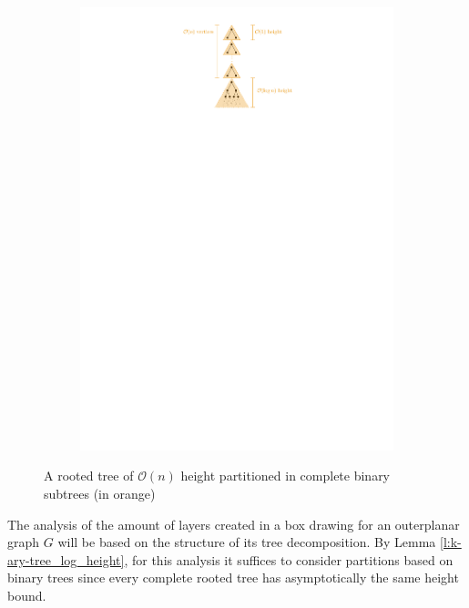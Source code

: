 	\begin{figure}[H]
	\centering
	\begin{subfigure}{\textwidth}
		\centering
		\includegraphics[page=1,width=0.7\linewidth]{graphics/k-ary_tree_partitioning_example.pdf}
	\end{subfigure}
	\caption{A rooted tree of $\mathcal{O}(n)$ height partitioned in complete binary subtrees (in orange)}\label{im:partitioning_example}
\end{figure}

The analysis of the amount of layers created in a box drawing for an outerplanar graph $G$ will be based on the structure of its tree decomposition. By Lemma \ref{l:k-ary-tree_log_height}, for this analysis it suffices to consider partitions based on binary trees since every complete rooted tree has asymptotically the same height bound.

